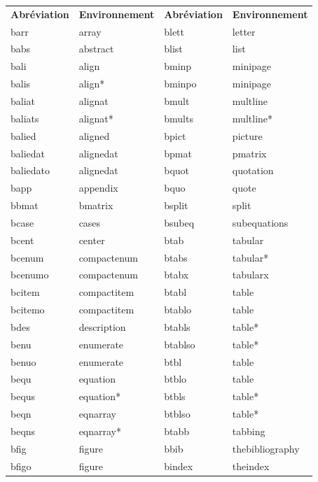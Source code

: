 \documentclass[11pt,french]{article}
\begin{document}
\begin{table}[H]
\small
\centering
\begin{tabular}{llll}
\textbf{Abréviation} & \textbf{Environnement} & \textbf{Abréviation} & \textbf{Environnement} \\
\cmidrule[0.5pt](lr){1-1} \cmidrule[0.5pt](lr){2-2} \cmidrule[0.5pt](lr){3-3} \cmidrule[0.5pt](lr){4-4}
barr      & array       & blett   & letter \\
babs      & abstract    & blist   & list \\
bali      & align       & bminp   & minipage \\
balis     & align*      & bminpo  & minipage \\
baliat    & alignat     & bmult   & multline \\
baliats   & alignat*    & bmults  & multline* \\
balied    & aligned     & bpict   & picture \\
baliedat  & alignedat   & bpmat   & pmatrix \\
baliedato & alignedat   & bquot   & quotation \\
bapp      & appendix    & bquo    & quote \\
bbmat     & bmatrix     & bsplit  & split \\
bcase     & cases       & bsubeq  & subequations \\
bcent     & center      & btab    & tabular \\
bcenum    & compactenum & btabs   & tabular* \\
bcenumo   & compactenum & btabx   & tabularx \\
bcitem    & compactitem & btabl   & table \\
bcitemo   & compactitem & btablo  & table \\
bdes      & description & btabls  & table* \\
benu      & enumerate   & btablso & table* \\
benuo     & enumerate   & btbl    & table \\
bequ      & equation    & btblo   & table \\
bequs     & equation*   & btbls   & table* \\
beqn      & eqnarray    & btblso  & table* \\
beqns     & eqnarray*   & btabb   & tabbing \\
bfig      & figure      & bbib    & thebibliography \\
bfigo     & figure      & bindex  & theindex \\

\end{tabular}
\end{table}
\end{document}
